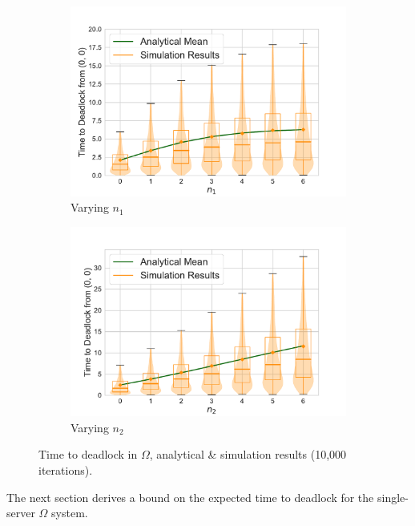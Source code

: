 \documentclass{article}
\numberwithin{equation}{section}
\begin{document}
\begin{figure}[!htbp]
\begin{center}
\begin{subfigure}[b]{0.48\textwidth}
  \includegraphics[width=\textwidth]{images/2Nmsfb_varyn1}
  \caption{Varying $n_1$}
  \label{fig:timestodeadlockfb_n1}
\end{subfigure}
\begin{subfigure}[b]{0.48\textwidth}
  \includegraphics[width=\textwidth]{images/2Nmsfb_varyn2}
  \caption{Varying $n_2$}
  \label{fig:timestodeadlockfb_n2}
\end{subfigure}
\end{center}
\caption{Time to deadlock in $\Omega$, analytical \& simulation results
(10,000 iterations).}
\label{fig:timestodeadlockfeedback}
\end{figure}



The next section derives a bound on the expected time to deadlock for the
single-server $\Omega$ system.
\end{document}
